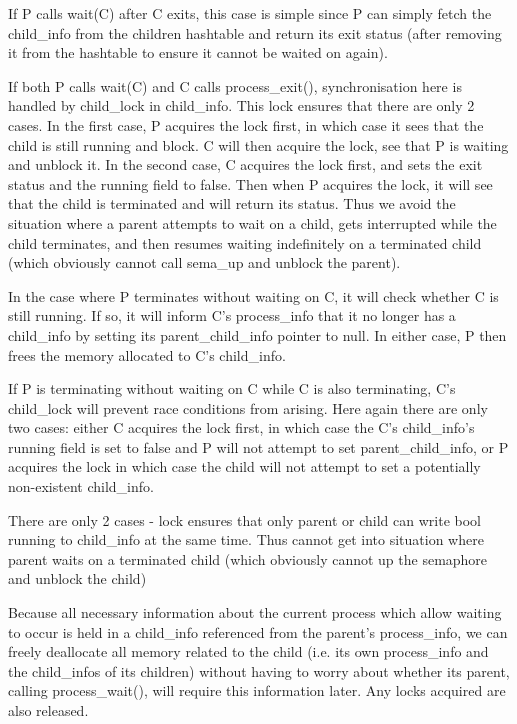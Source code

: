 If P calls wait(C) after C exits, this case is simple since P can simply fetch the child\_info from the children hashtable and return its exit status (after removing it from the hashtable to ensure it cannot be waited on again).

If both P calls wait(C) and C calls process\_exit(), synchronisation here is handled by child\_lock in child\_info. This lock ensures that there are only 2 cases. In the first case, P acquires the lock first, in which case it sees that the child is still running and block. C will then acquire the lock, see that P is waiting and unblock it. In the second case, C acquires the lock first, and sets the exit status and the running field to false. Then when P acquires the lock, it will see that the child is terminated and will return its status. Thus we avoid the situation where a parent attempts to wait on a child, gets interrupted while the child terminates, and then resumes waiting indefinitely on a terminated child (which obviously cannot call sema\_up and unblock the parent).

In the case where P terminates without waiting on C, it will check whether C is still running. If so, it will inform C's process\_info that it no longer has a child\_info by setting its parent\_child\_info pointer to null. In either case, P then frees the memory allocated to C's child\_info.

If P is terminating without waiting on C while C is also terminating, C's child\_lock will prevent race conditions from arising. Here again there are only two cases: either C acquires the lock first, in which case the C's child\_info's running field is set to false and P will not attempt to set parent\_child\_info, or P acquires the lock in which case the child will not attempt to set a potentially non-existent child\_info.

There are only 2 cases - lock ensures that only parent or child can write bool running to child\_info at the same time. Thus cannot get into situation where parent waits on a terminated child (which obviously cannot up the semaphore and unblock the child)

Because all necessary information about the current process which allow waiting to occur is held in a child\_info referenced from the parent's process\_info, we can freely deallocate all memory related to the child (i.e. its own process\_info and the child\_infos of its children) without having to worry about whether its parent, calling process\_wait(), will require this information later. Any locks acquired are also released.

